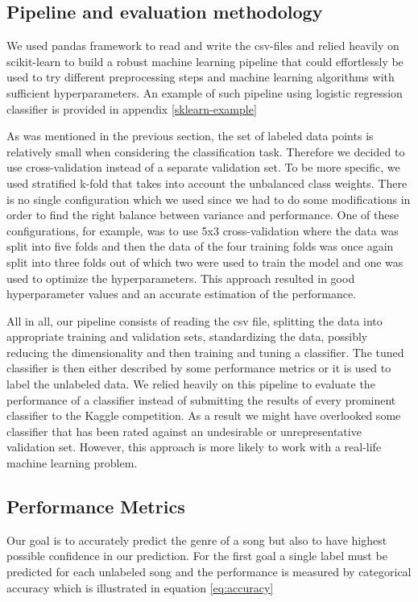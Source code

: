 \documentclass[fleqn,10pt]{SelfArx} %
\begin{document}
\subsection{Pipeline and evaluation methodology}

We used pandas framework to read and write the csv-files and relied
heavily on scikit-learn to build a robust machine learning pipeline that could
effortlessly be used to try different preprocessing steps and machine learning
algorithms with sufficient hyperparameters. An example of such pipeline using
logistic regression classifier is provided in appendix \ref{sklearn-example}

As was mentioned in the previous section, the set of labeled data points is
relatively small when considering the classification task. Therefore we decided
to use cross-validation instead of a separate validation set. To be more
specific, we used stratified k-fold that takes into account the
unbalanced class weights. There is no single configuration which we used since we
had to do some modifications in order to find the right balance between variance
and performance. One of these configurations, for example, was to use 5x3
cross-validation where the data was split into five folds and then the data of
the four training folds was once again split into three folds out of which two
were used to train the model and one was used to optimize the hyperparameters.
This approach resulted in good hyperparameter values and an accurate estimation
of the performance.

All in all, our pipeline consists of reading the csv file, splitting the data into
appropriate training and validation sets, standardizing the data, possibly reducing
the dimensionality and then training and tuning a classifier. The tuned
classifier is then either described by some performance metrics or it is used to
label the unlabeled data. We relied heavily on this pipeline to evaluate the
performance of a classifier instead of submitting the results of every
prominent classifier to the Kaggle competition. As a result we might have
overlooked some classifier that has been rated against an undesirable or
unrepresentative validation set. However, this approach is more likely to work
with a real-life machine learning problem.

\subsection{Performance Metrics}

Our goal is to accurately predict the genre of a song but also to have highest
possible confidence in our prediction. For the first goal a single label must be
predicted for each unlabeled song and the performance is measured by categorical
accuracy which is illustrated in equation \ref{eq:accuracy}
\end{document}
